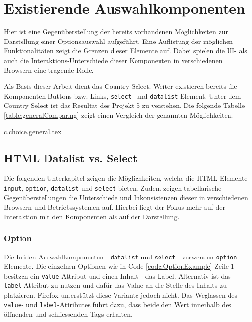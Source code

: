 \chapter{Existierende Auswahlkomponenten}
\label{chap:existingComponents}

Hier ist eine Gegenüberstellung der bereits vorhandenen Möglichkeiten zur Darstellung einer Optionsauswahl aufgeführt.
Eine Auflistung der möglichen Funktionalitäten zeigt die Grenzen dieser Elemente auf.
Dabei spielen die UI- als auch die Interaktions-Unterschiede dieser Komponenten in verschiedenen Browsern eine tragende Rolle.

Als Basis dieser Arbeit dient das Country Select.
Weiter existieren bereits die Komponenten Buttons bzw. Links, \texttt{select}- und \texttt{datalist}-Element.
Unter dem Country Select ist das Resultat des Projekt 5 zu verstehen.
Die folgende Tabelle \ref{table:generalComparing} zeigt einen Vergleich der genannten Möglichkeiten.

{c.choice.general.tex}


\section{HTML Datalist vs. Select}
\label{sec:datalistSelect}

Die folgenden Unterkapitel zeigen die Möglichkeiten, welche die HTML-Elemente \texttt{input}, \texttt{option}, \texttt{datalist} und \texttt{select} bieten.
Zudem zeigen tabellarische Gegenüberstellungen die Unterschiede und Inkonsistenzen dieser in verschiedenen Browsern und Betriebssystemen auf.
Hierbei liegt der Fokus mehr auf der Interaktion mit den Komponenten als auf der Darstellung.


\subsection{Option}
\label{sec:option}

Die beiden Auswahlkomponenten - \texttt{datalist} und \texttt{select} - verwenden \texttt{option}-Elemente. 
Die einzelnen Optionen wie in Code \ref{code:OptionExample} Zeile 1 besitzen ein \texttt{value}-Attribut und einen Inhalt - das Label.
Alternativ ist das \texttt{label}-Attribut zu nutzen und dafür das Value an die Stelle des Inhalts zu platzieren.
Firefox unterstützt diese Variante jedoch nicht.
Das Weglassen des \texttt{value}- und \texttt{label}-Attributes führt dazu, dass beide den Wert innerhalb des öffnenden und schliessenden Tags erhalten.

